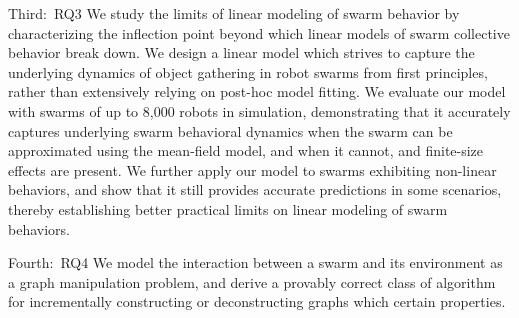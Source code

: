 
Third:~\glsdesc{RQ3} We study the limits of linear modeling of swarm behavior by
characterizing the inflection point beyond which linear models of swarm
collective behavior break down. We design a linear model which strives to
capture the underlying dynamics of object gathering in robot swarms from first
principles, rather than extensively relying on post-hoc model fitting.  We
evaluate our model with swarms of up to 8,000 robots in simulation,
demonstrating that it accurately captures underlying swarm behavioral dynamics
when the swarm can be approximated using the mean-field model, and when it
cannot, and finite-size effects are present.  We further apply our model to
swarms exhibiting non-linear behaviors, and show that it still provides accurate
predictions in some scenarios, thereby establishing better practical limits on
linear modeling of swarm behaviors.

Fourth:~\glsdesc{RQ4} We model the interaction between a swarm and its
environment as a graph manipulation problem, and derive a provably correct
class of algorithm for incrementally constructing or deconstructing graphs which
certain properties.
